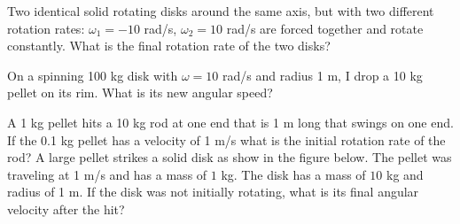 \documentclass[12pt]{article}
\begin{document}
\noindent Two identical solid rotating disks around the same axis, but with two different rotation rates: $\omega_1 = -10$ rad/s, $\omega_2 = 10$ rad/s are forced together and rotate constantly.  What is the final rotation rate of the two disks? 

\newpage
\noindent On a spinning 100 kg disk with $\omega = 10$ rad/s and radius 1 m, I drop a 10 kg pellet on its rim.  What is its new angular speed?

\newpage
\noindent A 1 kg pellet hits a 10 kg rod at one end that is 1 m long that swings on one end.  If the 0.1 kg pellet has a velocity of 1 m/s what is the initial rotation rate of the rod?
\newpage
\noindent A large pellet strikes a solid disk as show in the figure below.  The pellet was traveling at 1 m/s and has a mass of $1$ kg.  The disk has a mass of $10$ kg and radius of 1 m.  If the disk was not initially rotating, what is its final angular velocity after the hit? 

\resizebox{8cm}{!}{}
\end{document}
